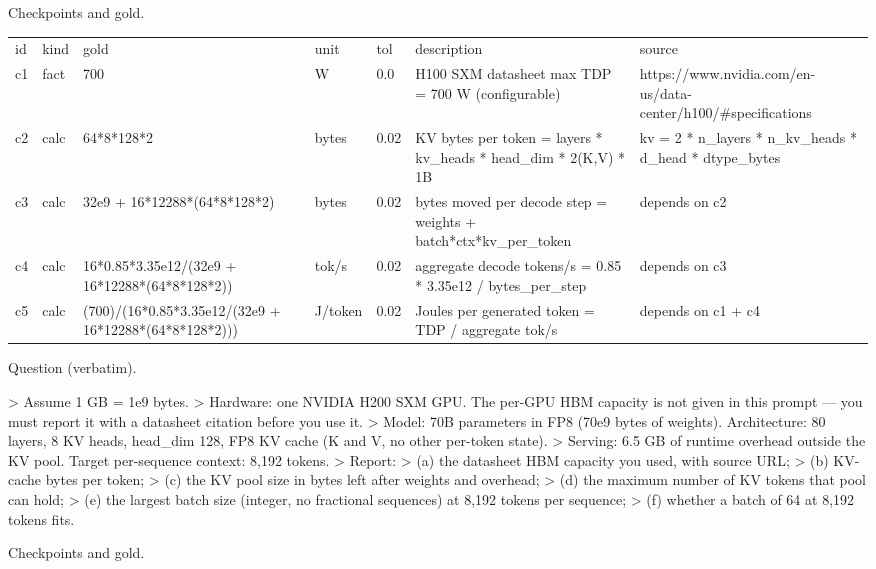 \documentclass[10pt,twocolumn]{article}
\begin{document}
Checkpoints and gold.


\begin{table}[h]
\centering
\begin{tabular}{lllllll}
id & kind & gold & unit & tol & description & source \\
c1 & fact & 700 & W & 0.0 & H100 SXM datasheet max TDP = 700 W (configurable) & https://www.nvidia.com/en-us/data-center/h100/\#specifications \\
c2 & calc & 64*8*128*2 & bytes & 0.02 & KV bytes per token = layers * kv\_heads * head\_dim * 2(K,V) * 1B & kv = 2 * n\_layers * n\_kv\_heads * d\_head * dtype\_bytes \\
c3 & calc & 32e9 + 16*12288*(64*8*128*2) & bytes & 0.02 & bytes moved per decode step = weights + batch*ctx*kv\_per\_token & depends on c2 \\
c4 & calc & 16*0.85*3.35e12/(32e9 + 16*12288*(64*8*128*2)) & tok/s & 0.02 & aggregate decode tokens/s = 0.85 * 3.35e12 / bytes\_per\_step & depends on c3 \\
c5 & calc & (700)/(16*0.85*3.35e12/(32e9 + 16*12288*(64*8*128*2))) & J/token & 0.02 & Joules per generated token = TDP / aggregate tok/s & depends on c1 + c4
\end{tabular}
\end{table}


Question (verbatim).


> Assume 1 GB = 1e9 bytes. > Hardware: one NVIDIA H200 SXM GPU. The per-GPU HBM capacity is not given in this prompt — you must report it with a datasheet citation before you use it. > Model: 70B parameters in FP8 (70e9 bytes of weights). Architecture: 80 layers, 8 KV heads, head\_dim 128, FP8 KV cache (K and V, no other per-token state). > Serving: 6.5 GB of runtime overhead outside the KV pool. Target per-sequence context: 8,192 tokens. > Report: > (a) the datasheet HBM capacity you used, with source URL; > (b) KV-cache bytes per token; > (c) the KV pool size in bytes left after weights and overhead; > (d) the maximum number of KV tokens that pool can hold; > (e) the largest batch size (integer, no fractional sequences) at 8,192 tokens per sequence; > (f) whether a batch of 64 at 8,192 tokens fits.


Checkpoints and gold.
\end{document}
